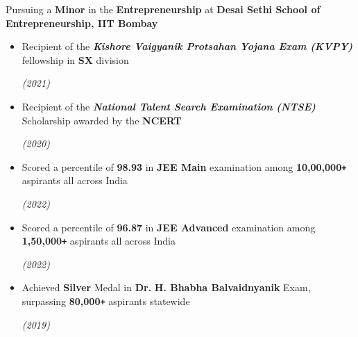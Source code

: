 \documentclass[10pt]{article}
\def\Plus{\texttt{\texttt{+}}}
\newcommand{\xfill}[2][1ex]{
	\dimen0=#2\advance\dimen0 by #1
	\leaders\hrule height \dimen0 depth -#1\hfill
}
\renewcommand{\section}[1]{
	\vspace{5pt}
	{\color{Blue}{\Large\scshape\raggedright #1\xfill[0pt]{0.5pt}}}
}
\newcommand{\filldate}[1]{\strut\hfill {\small \textit{(#1)}}}
\newif\iflong
\begin{document}
\iflong
	\addtolength{\topmargin}{9.54mm}
\fi


Pursuing a \textbf{Minor} in the \textbf{Entrepreneurship} at \textbf{Desai Sethi School of Entrepreneurship, IIT Bombay}
\vspace{0.5em}
\section{Scholastic Achievements}
\vspace{2pt}
\begin{itemize}
    \item Recipient of the \textbf{\textit{Kishore Vaigyanik Protsahan Yojana Exam (KVPY)}} fellowship in \textbf{SX} division
    \filldate{2021}
    \item Recipient of the \textit{\textbf{National Talent Search Examination (NTSE)}} Scholarship awarded by the \textbf{NCERT}
    \filldate{2020}
    \item Scored a percentile of \textbf{98.93} in \textbf{JEE Main} examination among \textbf{10,00,000\Plus} aspirants all across India
    \filldate{2022}
    \item Scored a percentile of \textbf{96.87} in \textbf{JEE Advanced} examination among \textbf{1,50,000\Plus} aspirants all across India
    \filldate{2022}
    \item Achieved \textbf{Silver} Medal in \textbf{Dr.} \textbf{H. Bhabha Balvaidnyanik} Exam, surpassing \textbf{80,000\Plus} aspirants statewide
    \filldate{2019}
    
\end{itemize}

\section{Key Projects And Experience}
\vspace{5px}
\end{document}
